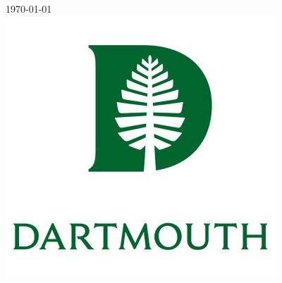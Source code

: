 \begin{titlingpage}


{\large \today}\\[2cm] %


\includegraphics[scale=0.3]{dartmouth-crest.jpg}\\[1cm] %


\vfill %

\end{titlingpage}
